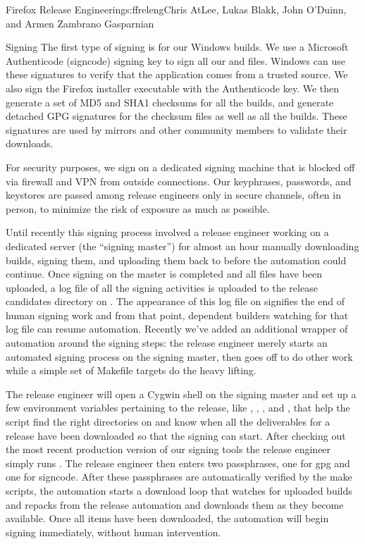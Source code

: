\begin{aosachapter}{Firefox Release Engineering}{s:ffreleng}{Chris AtLee, Lukas Blakk, John O'Duinn, and Armen Zambrano Gasparnian}
\begin{aosasect1}{Signing}
The first type of signing is for our Windows builds. We use a
Microsoft Authenticode (signcode) signing key to sign all our
 and  files. Windows can use these signatures to
verify that the application comes from a trusted source. We also sign
the Firefox installer executable with the Authenticode key.  We then
generate a set of MD5 and SHA1 checksums for all the builds, and
generate detached GPG signatures for the checksum files as well as all
the builds. These signatures are used by mirrors and other community
members to validate their downloads.

For security purposes, we sign on a dedicated signing machine that is
blocked off via firewall and VPN from outside connections. Our
keyphrases, passwords, and keystores are passed among release
engineers only in secure channels, often in person, to minimize the
risk of exposure as much as possible.


Until recently this signing process involved a release engineer
working on a dedicated server (the ``signing master'') for almost an
hour manually downloading builds, signing them, and
uploading them back to  before the automation could
continue.  Once signing on the master is completed and all files have
been uploaded, a log file of all the signing activities is uploaded to
the release candidates directory on .  The appearance
of this log file on  signifies the end of human signing
work and from that point, dependent builders watching for that log
file can resume automation.  Recently we've added an additional
wrapper of automation around the signing steps: the release engineer
merely starts an automated signing process on the signing master, then
goes off to do other work while a simple set of Makefile targets do
the heavy lifting.

The release engineer will open a Cygwin shell on the signing master
and set up a few environment variables pertaining to the release, like
, , , and , that
help the script find the right directories on  and know
when all the deliverables for a release have been downloaded so that
the signing can start. After checking out the most recent production
version of our signing tools the release engineer simply runs
. The release engineer then enters two
passphrases, one for gpg and one for signcode. After these passphrases
are automatically verified by the make scripts, the automation
starts a download loop that watches for uploaded builds and repacks
from the release automation and downloads them as they become
available.  Once all items have been downloaded, the automation will
begin signing immediately, without human intervention. 


\end{aosasect1}
\end{aosachapter}
